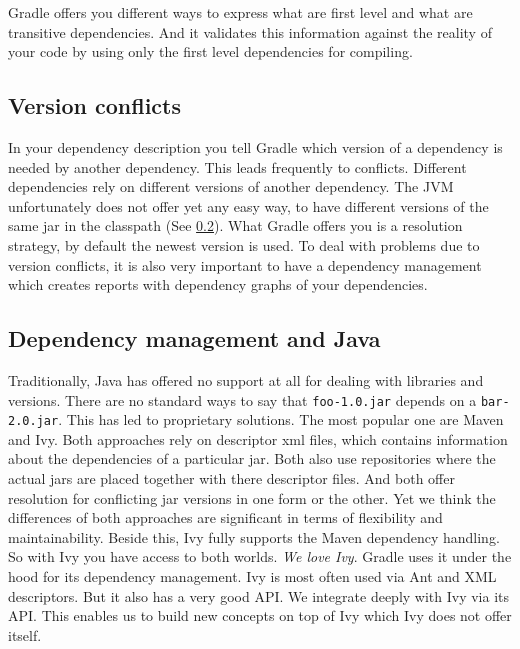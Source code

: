 Gradle offers you different ways to express what are first level and what are transitive dependencies. And it validates this information against the reality of your code by using only the first level dependencies for compiling.

\subsection{Version conflicts} %
\label{sub:version_conflicts}
In your dependency description you tell Gradle which version of a dependency is needed by another dependency. This leads frequently to conflicts. Different dependencies rely on different versions of another dependency. The JVM unfortunately does not offer yet any easy way, to have different versions of the same jar in the classpath (See \ref{sub:dependency_management_and_java}). What Gradle offers you is a resolution strategy, by default the newest version is used. To deal with problems due to version conflicts, it is also very important to have a dependency management which creates reports with dependency graphs of your dependencies.

\subsection{Dependency management and Java} %
\label{sub:dependency_management_and_java}
Traditionally, Java has offered no support at all for dealing with libraries and versions. There are no standard ways to say that \texttt{foo-1.0.jar} depends on a \texttt{bar-2.0.jar}. This has led to proprietary solutions. The most popular one are Maven and Ivy. Both approaches rely on descriptor xml files, which contains information about the dependencies of a particular jar. Both also use repositories where the actual jars are placed together with there descriptor files. And both offer resolution for conflicting jar versions in one form or the other. Yet we think the differences of both approaches are significant in terms of flexibility and maintainability. Beside this, Ivy fully supports the Maven dependency handling. So with Ivy you have access to both worlds. \emph{We love Ivy}. Gradle uses it under the hood for its dependency management. Ivy is most often used via Ant and XML descriptors. But it also has a very good API. We integrate deeply with Ivy via its API. This enables us to build new concepts on top of Ivy which Ivy does not offer itself. 

